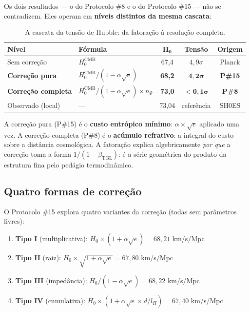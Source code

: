 \documentclass[12pt,a4paper,twoside]{article}
\newcommand{\betatgl}{\beta_{\!\scriptscriptstyle\mathrm{TGL}}}
\begin{document}
Os dois resultados --- o do Protocolo \#8 e o do Protocolo \#15 --- não se contradizem. Eles operam em \textbf{níveis distintos da mesma cascata}:

\begin{table}[H]
\centering
\caption{A cascata da tensão de Hubble: da fatoração à resolução completa.}
\label{tab:cascata}
\begin{tabular}{llccc}
\toprule
\textbf{Nível} & \textbf{Fórmula} & $\boldsymbol{H_0}$ & \textbf{Tensão} & \textbf{Origem} \\
\midrule
Sem correção & $H_0^{\text{CMB}}$ & 67{,}4 & $4{,}9\sigma$ & Planck \\
\textbf{Correção pura} & $H_0^{\text{CMB}}/(1 - \alpha\sqrt{e})$ & \textbf{68{,}2} & $\boldsymbol{4{,}2\sigma}$ & \textbf{P\#15} \\
\textbf{Correção completa} & $H_0^{\text{CMB}}/(1 - \alpha\sqrt{e}) \times n_\Psi$ & \textbf{73{,}0} & $\boldsymbol{< 0{,}1\sigma}$ & \textbf{P\#8} \\
\midrule
Observado (local) & --- & 73{,}04 & referência & SH0ES \\
\bottomrule
\end{tabular}
\end{table}

\noindent A correção pura (P\#15) é o \textbf{custo entrópico mínimo}: $\alpha \times \sqrt{e}$ aplicado uma vez. A correção completa (P\#8) é o \textbf{acúmulo refrativo}: a integral do custo sobre a distância cosmológica. A fatoração explica algebricamente \textit{por que} a correção toma a forma $1/(1 - \betatgl)$: é a série geométrica do produto da estrutura fina pelo pedágio termodinâmico.


\subsection{Quatro formas de correção}

O Protocolo \#15 explora quatro variantes da correção (todas sem parâmetros livres):

\begin{enumerate}[nosep]
\item \textbf{Tipo I} (multiplicativa): $H_0 \times (1 + \alpha\sqrt{e}) = 68{,}21$ km/s/Mpc
\item \textbf{Tipo II} (raiz): $H_0 \times \sqrt{1 + \alpha\sqrt{e}} = 67{,}80$ km/s/Mpc
\item \textbf{Tipo III} (impedância): $H_0 / (1 - \alpha\sqrt{e}) = 68{,}22$ km/s/Mpc
\item \textbf{Tipo IV} (cumulativa): $H_0 \times (1 + \alpha\sqrt{e} \times d/l_H) = 67{,}40$ km/s/Mpc
\end{enumerate}
\end{document}
